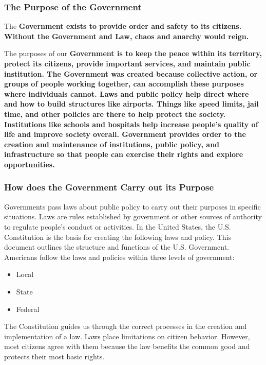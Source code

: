 
\subsubsection*{The Purpose of the Government}

The \bf{Government} exists to provide order and safety to its citizens.
Without the \bf{Government} and \bf{Law}, chaos and anarchy would
reign.

The purposes of our \bf{Government} is to keep the peace within its
territory, protect its citizens, provide important services, and maintain
public institution. The Government was created because collective
action, or groups of people working together, can accomplish these purposes
where individuals cannot. Laws and public policy help direct where and how to
build structures like airports. Things like speed limits, jail time, and other
policies are there to help protect the society. Institutions like schools and
hospitals help increase people's quality of life and improve society overall.
Government provides order to the creation and maintenance of institutions,
public policy, and infrastructure so that people can exercise their rights and
explore opportunities.


\subsubsection*{How does the Government Carry out its Purpose}
\label{sub_sec:how_does_the_government_carry_out_its_purpose}

Governments pass laws about public policy to carry out their purposes in
specific situations. Laws are rules established by government or other sources
of authority to regulate people's conduct or activities. In the United States,
the U.S. Constitution is the basis for creating the following laws and policy.
This document outlines the structure and functions of the U.S. Government.
Americans follow the laws and policies within three levels of government:

\begin{itemize}
  \item Local
  \item State
  \item Federal
\end{itemize}

The Constitution guides us through the correct processes in the creation and
implementation of a law. Laws place limitations on citizen behavior. However,
most citizens agree with them because the law benefits the common good and
protects their most basic rights.

